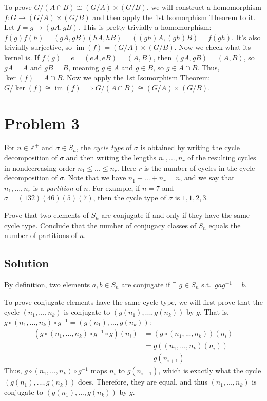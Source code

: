 \documentclass[fleqn]{article}
\DeclareMathOperator{\im}{im}
\begin{document}
        To prove $G/(A \cap B) \cong (G/A) \times (G/B)$, we will construct a homomorphism $f: G \to (G/A) \times (G/B)$ and then apply the 1st Isomorphism Theorem to it.  Let $f = g \mapsto (gA, gB)$.  This is pretty trivially a homomorphism: $f(g)f(h) = (gA, gB)(hA, hB) = ((gh)A, (gh)B) = f(gh)$.  It's also trivially surjective, so $\im(f) = (G/A) \times (G/B)$.  Now we check what its kernel is.  If $f(g) = e = (eA, eB) = (A, B)$, then $(gA, gB) = (A, B)$, so $gA = A$ and $gB = B$, meaning $g \in A$ and $g \in B$, so $g \in A \cap B$.  Thus, $\ker(f) = A \cap B$.  Now we apply the 1st Isomorphism Theorem: $G/\ker(f) \cong \im(f) \implies G/(A \cap B) \cong (G/A) \times (G/B)$.
    
    \section{Problem 3}
    For $n \in \mathbb{Z}^+$ and $\sigma \in S_n$, the \textit{cycle type} of $\sigma$ is obtained by writing the cycle decomposition of $\sigma$ and then writing the lengths $n_1, ..., n_r$ of the resulting cycles in nondecreasing order $n_1 \leq ... \leq n_r$.  Here $r$ is the number of cycles in the cycle decomposition of $\sigma$.  Note that we have $n_1 + ... + n_r = n$, and we say that $n_1, ..., n_r$ is a \textit{partition} of $n$.  For example, if $n = 7$ and $\sigma = (1 3 2)(4 6)(5)(7)$, then the cycle type of $\sigma$ is $1, 1, 2, 3$.
    
    Prove that two elements of $S_n$ are conjugate if and only if they have the same cycle type.  Conclude that the number of conjugacy classes of $S_n$ equals the number of partitions of $n$.
        
        \subsection{Solution}
        By definition, two elements $a, b \in S_n$ are conjugate if $\exists$ $g \in S_n$ s.t.\ $gag^{-1} = b$.  
        
        To prove conjugate elements have the same cycle type, we will first prove that the cycle $(n_1, ..., n_k)$ is conjugate to $(g(n_1), ..., g(n_k))$ by $g$.  That is, $g \circ (n_1, ..., n_k) \circ g^{-1} = (g(n_1), ..., g(n_k))$:
        \begin{align}
            (g \circ (n_1, ..., n_k) \circ g^{-1} \circ g)(n_i)
                &= (g \circ (n_1, ..., n_k))(n_i) \\
                &= g((n_1, ..., n_k)(n_i)) \\
                &= g(n_{i + 1})
        \end{align}
        Thus, $g \circ (n_1, ..., n_k) \circ g^{-1}$ maps $n_i$ to $g(n_{i + 1})$, which is exactly what the cycle $(g(n_1), ..., g(n_k))$ does.  Therefore, they are equal, and thus $(n_1, ..., n_k)$ is conjugate to $(g(n_1), ..., g(n_k))$ by $g$.
        
\end{document}
